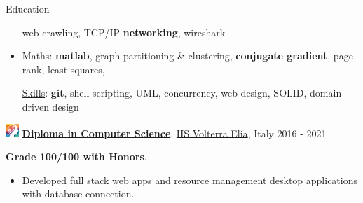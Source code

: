 \documentclass{cv} %
\def\intraexpvspace{0.15cm}
\def\titlelistvspace{-0.15cm}
\begin{document}
\begin{rSection}{Education}
\begin{itemize}
              web crawling,
              TCP/IP \textbf{networking},
              wireshark
        \item Maths:
              \textbf{matlab},
              graph partitioning \& clustering,
              \textbf{conjugate gradient},
              page rank,
              least squares,

              \vspace*{-0.1cm}\hspace*{-0.4cm}\underline{Skills}:
              \textbf{git},
              shell scripting,
              UML,
              concurrency,
              web design,
              SOLID,
              domain driven design
    \end{itemize}
    \vspace{\intraexpvspace}
    \includegraphics[width=0.5cm, trim={0cm 1cm 0cm 0cm}]{iisve-icon.png}
    {\bf \underline{Diploma in Computer Science}},
    \href{https://www.istitutovolterraelia.it/}{IIS Volterra Elia},
    Italy
    \hfill{2016 - 2021}

    \textbf{Grade 100/100 with Honors}.

    \vspace{\titlelistvspace}\begin{itemize}
        \itemsep -3pt {}
        \item Developed full stack web apps and resource management desktop applications with database connection.
    \end{itemize}


\end{rSection}
\end{document}
